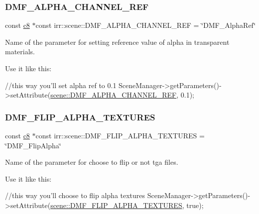 \subsubsection{\texorpdfstring{D\+M\+F\+\_\+\+A\+L\+P\+H\+A\+\_\+\+C\+H\+A\+N\+N\+E\+L\+\_\+\+R\+EF}{DMF\_ALPHA\_CHANNEL\_REF}}
{\footnotesize\ttfamily const \hyperlink{namespaceirr_a9395eaea339bcb546b319e9c96bf7410}{c8} $\ast$const irr\+::scene\+::\+D\+M\+F\+\_\+\+A\+L\+P\+H\+A\+\_\+\+C\+H\+A\+N\+N\+E\+L\+\_\+\+R\+EF = \char`\"{}D\+M\+F\+\_\+\+Alpha\+Ref\char`\"{}}



Name of the parameter for setting reference value of alpha in transparent materials. 

Use it like this\+: 
\begin{DoxyCode}
\textcolor{comment}{//this way you'll set alpha ref to 0.1}
SceneManager->getParameters()->setAttribute(\hyperlink{namespaceirr_1_1scene_a21e42b7847ca0eed258b80aac458b7dd}{scene::DMF\_ALPHA\_CHANNEL\_REF}, 0.1);
\end{DoxyCode}
 \mbox{\label{namespaceirr_1_1scene_ae28846d2b02cbfc70c6771919a3b5edd}} 
\subsubsection{\texorpdfstring{D\+M\+F\+\_\+\+F\+L\+I\+P\+\_\+\+A\+L\+P\+H\+A\+\_\+\+T\+E\+X\+T\+U\+R\+ES}{DMF\_FLIP\_ALPHA\_TEXTURES}}
{\footnotesize\ttfamily const \hyperlink{namespaceirr_a9395eaea339bcb546b319e9c96bf7410}{c8} $\ast$const irr\+::scene\+::\+D\+M\+F\+\_\+\+F\+L\+I\+P\+\_\+\+A\+L\+P\+H\+A\+\_\+\+T\+E\+X\+T\+U\+R\+ES = \char`\"{}D\+M\+F\+\_\+\+Flip\+Alpha\char`\"{}}



Name of the parameter for choose to flip or not tga files. 

Use it like this\+: 
\begin{DoxyCode}
\textcolor{comment}{//this way you'll choose to flip alpha textures}
SceneManager->getParameters()->setAttribute(\hyperlink{namespaceirr_1_1scene_ae28846d2b02cbfc70c6771919a3b5edd}{scene::DMF\_FLIP\_ALPHA\_TEXTURES}, \textcolor{keyword}{
      true});
\end{DoxyCode}
 \mbox{\label{namespaceirr_1_1scene_a65c32f1534d2bff391ded668a748e39b}} 
